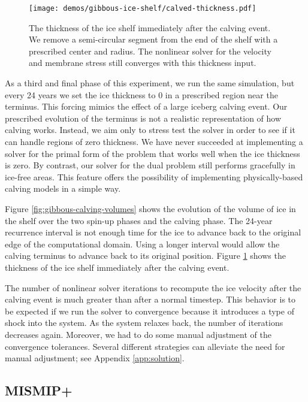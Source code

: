 \documentclass{article}
\theoremstyle{definition}
\theoremstyle{plain}
\begin{document}
\begin{figure}[t]
    \begin{center}
        \texttt{[image: demos/gibbous-ice-shelf/calved-thickness.pdf]}
    \end{center}
    \caption{The thickness of the ice shelf immediately after the calving event.
    We remove a semi-circular segment from the end of the shelf with a prescribed center and radius.
    The nonlinear solver for the velocity and membrane stress still converges with this thickness input.}
    \label{fig:gibbous-calving-thickness}
\end{figure}

As a third and final phase of this experiment, we run the same simulation, but every 24 years we set the ice thickness to 0 in a prescribed region near the terminus.
This forcing mimics the effect of a large iceberg calving event.
Our prescribed evolution of the terminus is not a realistic representation of how calving works.
Instead, we aim only to stress test the solver in order to see if it can handle regions of zero thickness.
We have never succeeded at implementing a solver for the primal form of the problem that works well when the ice thickness is zero.
By contrast, our solver for the dual problem still performs gracefully in ice-free areas.
This feature offers the possibility of implementing physically-based calving models in a simple way.

Figure \ref{fig:gibbous-calving-volumes} shows the evolution of the volume of ice in the shelf over the two spin-up phases and the calving phase.
The 24-year recurrence interval is not enough time for the ice to advance back to the original edge of the computational domain.
Using a longer interval would allow the calving terminus to advance back to its original position.
Figure \ref{fig:gibbous-calving-thickness} shows the thickness of the ice shelf immediately after the calving event.

The number of nonlinear solver iterations to recompute the ice velocity after the calving event is much greater than after a normal timestep.
This behavior is to be expected if we run the solver to convergence because it introduces a type of shock into the system.
As the system relaxes back, the number of iterations decreases again.
Moreover, we had to do some manual adjustment of the convergence tolerances.
Several different strategies can alleviate the need for manual adjustment; see Appendix \ref{app:solution}.

\subsection{MISMIP+} \label{sec:mismip}
\end{document}
